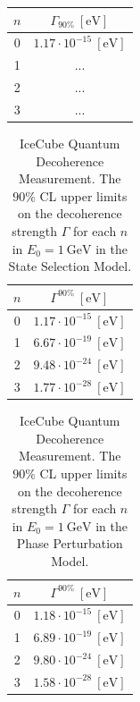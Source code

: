 \begin{tabular}{|c|c|}
\hline
\rule[-1.2ex]{0pt}{3.5ex} $n$ & $\Gamma_{90\%}\ [\mathrm{eV}]$ \\
\hline
0 & $1.17 \cdot 10^{-15}\ [\mathrm{eV}]$ \\
1 & ... \\
2 & ... \\
3 & ... \\
\hline
\end{tabular}


\begin{table}
\caption[IceCube Quantum Decoherence Measurement (State Selection Model)]{IceCube Quantum Decoherence Measurement. The $90\%$ CL upper limits on the decoherence strength $\Gamma$ for each $n$ in $E_0=1\ \mathrm{GeV}$ in the State Selection Model.}
\renewcommand{\arraystretch}{1.2}
\begin{tabular}{|c|c|}
\hline
$n$ & $\Gamma^{90\%}\ [\mathrm{eV}]$ \\
\hline
0 & $1.17 \cdot 10^{-15}\ [\mathrm{eV}]$ \\
1 & $6.67 \cdot 10^{-19}\ [\mathrm{eV}]$ \\
2 & $9.48 \cdot 10^{-24}\ [\mathrm{eV}]$ \\
3 & $1.77 \cdot 10^{-28}\ [\mathrm{eV}]$ \\
\hline
\end{tabular}
\end{table}

\begin{table}
\caption[IceCube Quantum Decoherence Measurement (Phase Perturbation Model)]{IceCube Quantum Decoherence Measurement. The $90\%$ CL upper limits on the decoherence strength $\Gamma$ for each $n$ in $E_0=1\ \mathrm{GeV}$ in the Phase Perturbation Model.}
\renewcommand{\arraystretch}{1.2}
\begin{tabular}{|c|c|}
\hline
$n$ & $\Gamma^{90\%}\ [\mathrm{eV}]$ \\
\hline
0 & $1.18 \cdot 10^{-15}\ [\mathrm{eV}]$ \\
1 & $6.89 \cdot 10^{-19}\ [\mathrm{eV}]$ \\
2 & $9.80 \cdot 10^{-24}\ [\mathrm{eV}]$ \\
3 & $1.58 \cdot 10^{-28}\ [\mathrm{eV}]$ \\
\hline
\end{tabular}
\end{table}

